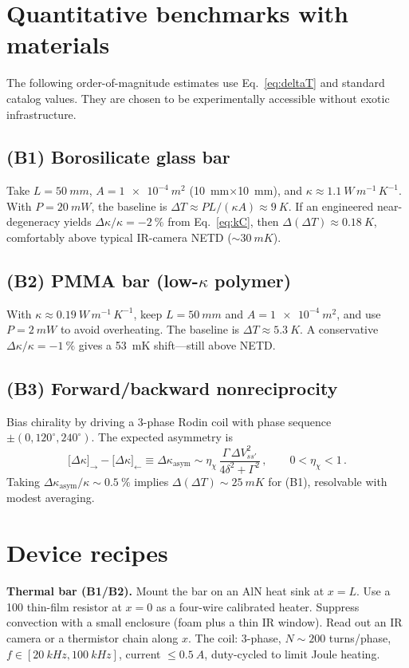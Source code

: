\documentclass[aps,prb,preprint,amsmath,amssymb]{revtex4-2} %
\begin{document}
    \section{Quantitative benchmarks with materials}
        The following order-of-magnitude estimates use Eq.~\eqref{eq:deltaT} and standard catalog values. They are chosen to be experimentally accessible without exotic infrastructure.

        \subsection*{(B1) Borosilicate glass bar}
            Take $L=\SI{50}{mm}$, $A=\SI{1e-4}{m^2}$ (\SI{10}{mm}$\times$\SI{10}{mm}), and $\kappa\approx\SI{1.1}{W\,m^{-1}\,K^{-1}}$. With $P=\SI{20}{mW}$, the baseline is $\Delta T \approx P L/(\kappa A) \approx \SI{9}{K}$. If an engineered near-degeneracy yields $\Delta\kappa/\kappa=\SI{-2}{\percent}$ from Eq.~\eqref{eq:kC}, then $\Delta(\Delta T)\approx\SI{+0.18}{K}$, comfortably above typical IR-camera NETD ($\sim\SI{30}{mK}$).

        \subsection*{(B2) PMMA bar (low-$\kappa$ polymer)}
            With $\kappa\approx\SI{0.19}{W\,m^{-1}\,K^{-1}}$, keep $L=\SI{50}{mm}$ and $A=\SI{1e-4}{m^2}$, and use $P=\SI{2}{mW}$ to avoid overheating. The baseline is $\Delta T\!\approx\!\SI{5.3}{K}$. A conservative $\Delta\kappa/\kappa=\SI{-1}{\percent}$ gives a \SI{53}{mK} shift—still above NETD.

        \subsection*{(B3) Forward/backward nonreciprocity}
            Bias chirality by driving a 3-phase Rodin coil with phase sequence $\pm(0,120^\circ,240^\circ)$. The expected asymmetry is
            \begin{equation}
                \big[\Delta\kappa\big]_{\rightarrow}-\big[\Delta\kappa\big]_{\leftarrow} \equiv \Delta\kappa_\text{asym} \sim \eta_\chi\, \frac{\Gamma\,\Delta V_{ss'}^{2}}{4\delta^2+\Gamma^2}\,,\qquad 0<\eta_\chi<1\,.
            \end{equation}
            Taking $\Delta\kappa_\text{asym}/\kappa\sim\SI{0.5}{\percent}$ implies $\Delta(\Delta T)\sim\SI{25}{mK}$ for (B1), resolvable with modest averaging.

    \section{Device recipes}
        \textbf{Thermal bar (B1/B2).} Mount the bar on an AlN heat sink at $x=L$. Use a \SI{100}{\Omega} thin-film resistor at $x=0$ as a four-wire calibrated heater. Suppress convection with a small enclosure (foam plus a thin IR window). Read out an IR camera or a thermistor chain along $x$. The coil: 3-phase, $N\!\sim\!200$ turns/phase, $f\in[\SI{20}{kHz},\SI{100}{kHz}]$, current $\le\SI{0.5}{A}$, duty-cycled to limit Joule heating.
\end{document}
